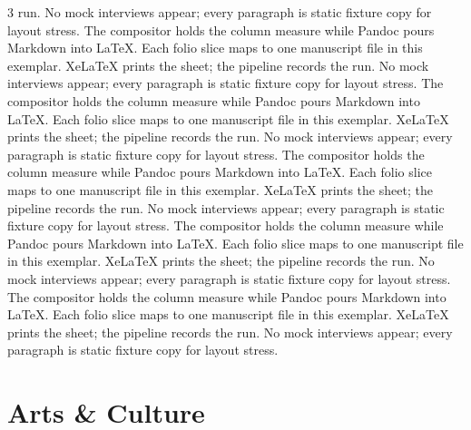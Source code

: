 \documentclass[
]{article}
\begin{document}
\begin{multicols}{3}
run. No mock interviews appear; every paragraph is static fixture copy
for layout stress. The compositor holds the column measure while Pandoc
pours Markdown into LaTeX. Each folio slice maps to one manuscript file
in this exemplar. XeLaTeX prints the sheet; the pipeline records the
run. No mock interviews appear; every paragraph is static fixture copy
for layout stress. The compositor holds the column measure while Pandoc
pours Markdown into LaTeX. Each folio slice maps to one manuscript file
in this exemplar. XeLaTeX prints the sheet; the pipeline records the
run. No mock interviews appear; every paragraph is static fixture copy
for layout stress. The compositor holds the column measure while Pandoc
pours Markdown into LaTeX. Each folio slice maps to one manuscript file
in this exemplar. XeLaTeX prints the sheet; the pipeline records the
run. No mock interviews appear; every paragraph is static fixture copy
for layout stress. The compositor holds the column measure while Pandoc
pours Markdown into LaTeX. Each folio slice maps to one manuscript file
in this exemplar. XeLaTeX prints the sheet; the pipeline records the
run. No mock interviews appear; every paragraph is static fixture copy
for layout stress. The compositor holds the column measure while Pandoc
pours Markdown into LaTeX. Each folio slice maps to one manuscript file
in this exemplar. XeLaTeX prints the sheet; the pipeline records the
run. No mock interviews appear; every paragraph is static fixture copy
for layout stress.

\end{multicols}

\newpage

\section{Arts \& Culture}\label{arts-culture}
\end{document}
